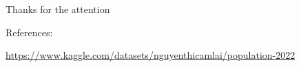 \documentclass[
	11pt, %
]{beamer}
\begin{document}
\begin{frame}[plain] %
	\begin{center}
		{\Huge Thanks for the attention}
		
		\bigskip\bigskip %
		
		{\LARGE References:}
		
		\bigskip
		\small

		\url{https://www.kaggle.com/datasets/nguyenthicamlai/population-2022}

	\end{center}
\end{frame}
\end{document}
